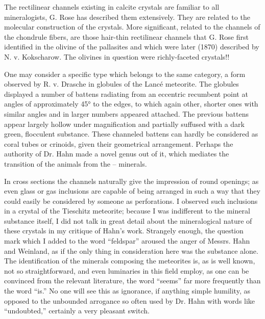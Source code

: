 \documentclass[a4paper, 12pt, oneside]{article}
\begin{document}
The rectilinear channels existing in calcite crystals are familiar to all mineralogists, G. Rose has described them extensively. They are related to the molecular construction of the crystals. More significant, related to the channels of the chondrule fibers, are those hair-thin rectilinear channels that G. Rose first identified in the olivine of the pallasites and which were later (1870) described by N. v. Kokscharow. The olivines in question were richly-faceted crystals!!

One may consider a specific type which belongs to the same category, a form observed by R. v. Drasche in globules of the Lancé meteorite. The globules displayed a number of battens radiating from an eccentric recumbent point at angles of approximately 45° to the edges, to which again other, shorter ones with similar angles and in larger numbers appeared attached. The previous battens appear largely hollow under magnification and partially suffused with a dark green, flocculent substance. These channeled battens can hardly be considered as coral tubes or crinoids, given their geometrical arrangement. Perhaps the authority of Dr. Hahn made a novel genus out of it, which mediates the transition of the animals from the – minerals.

In cross sections the channels naturally give the impression of round openings; as even glass or gas inclusions are capable of being arranged in such a way that they could easily be considered by someone as perforations. I observed such inclusions in a crystal of the Tieschitz meteorite; because I was indifferent to the mineral substance itself, I did not talk in great detail about the mineralogical nature of these crystals in my critique of Hahn's work. Strangely enough, the question mark which I added to the word ``feldspar'' aroused the anger of Messrs. Hahn and Weinland, as if the only thing in consideration here was the substance alone. The identification of the minerals composing the meteorites is, as is well known, not so straightforward, and even luminaries in this field employ, as one can be convinced from the relevant literature, the word ``seems'' far more frequently than the word ``is.'' No one will see this as ignorance, if anything simple humility, as opposed to the unbounded arrogance so often used by Dr. Hahn with words like ``undoubted,'' certainly a very pleasant switch.
\end{document}
